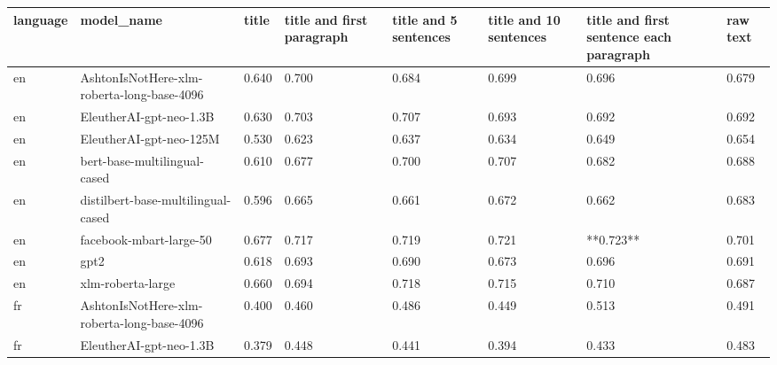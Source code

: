 \begin{tabular}{llllllll}
\toprule
language &                                 model\_name & title & title and first paragraph & title and 5 sentences & title and 10 sentences & title and first sentence each paragraph &  raw text \\
\midrule
      en & AshtonIsNotHere-xlm-roberta-long-base-4096 & 0.640 &                     0.700 &                 0.684 &                  0.699 &                                   0.696 &     0.679 \\
      en &                    EleutherAI-gpt-neo-1.3B & 0.630 &                     0.703 &                 0.707 &                  0.693 &                                   0.692 &     0.692 \\
      en &                    EleutherAI-gpt-neo-125M & 0.530 &                     0.623 &                 0.637 &                  0.634 &                                   0.649 &     0.654 \\
      en &               bert-base-multilingual-cased & 0.610 &                     0.677 &                 0.700 &                  0.707 &                                   0.682 &     0.688 \\
      en &         distilbert-base-multilingual-cased & 0.596 &                     0.665 &                 0.661 &                  0.672 &                                   0.662 &     0.683 \\
      en &                    facebook-mbart-large-50 & 0.677 &                     0.717 &                 0.719 &                  0.721 &                               **0.723** &     0.701 \\
      en &                                       gpt2 & 0.618 &                     0.693 &                 0.690 &                  0.673 &                                   0.696 &     0.691 \\
      en &                          xlm-roberta-large & 0.660 &                     0.694 &                 0.718 &                  0.715 &                                   0.710 &     0.687 \\
      fr & AshtonIsNotHere-xlm-roberta-long-base-4096 & 0.400 &                     0.460 &                 0.486 &                  0.449 &                                   0.513 &     0.491 \\
      fr &                    EleutherAI-gpt-neo-1.3B & 0.379 &                     0.448 &                 0.441 &                  0.394 &                                   0.433 &     0.483 \\

\end{tabular}
